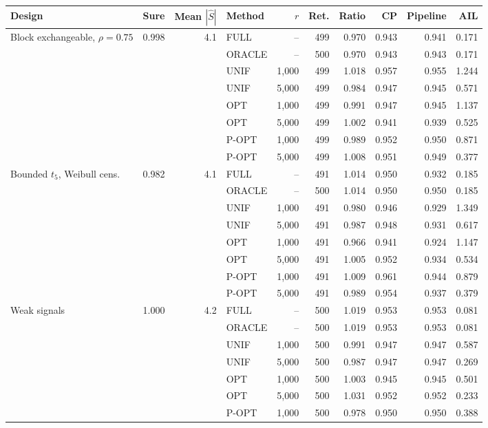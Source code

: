 \begin{tabular}{lrrlrrrrrr}
\toprule
Design & Sure & Mean \(|\widehat S|\) & Method & \(r\) & Ret. & Ratio & CP & Pipeline & AIL\\
\midrule
Block exchangeable, \(\rho=0.75\) & 0.998 & 4.1 & FULL & -- & 499 & 0.970 & 0.943 & 0.941 & 0.171\\
 &  &  & ORACLE & -- & 500 & 0.970 & 0.943 & 0.943 & 0.171\\
 &  &  & UNIF & 1,000 & 499 & 1.018 & 0.957 & 0.955 & 1.244\\
 &  &  & UNIF & 5,000 & 499 & 0.984 & 0.947 & 0.945 & 0.571\\
 &  &  & OPT & 1,000 & 499 & 0.991 & 0.947 & 0.945 & 1.137\\
 &  &  & OPT & 5,000 & 499 & 1.002 & 0.941 & 0.939 & 0.525\\
 &  &  & P-OPT & 1,000 & 499 & 0.989 & 0.952 & 0.950 & 0.871\\
 &  &  & P-OPT & 5,000 & 499 & 1.008 & 0.951 & 0.949 & 0.377\\
\addlinespace
Bounded \(t_5\), Weibull cens. & 0.982 & 4.1 & FULL & -- & 491 & 1.014 & 0.950 & 0.932 & 0.185\\
 &  &  & ORACLE & -- & 500 & 1.014 & 0.950 & 0.950 & 0.185\\
 &  &  & UNIF & 1,000 & 491 & 0.980 & 0.946 & 0.929 & 1.349\\
 &  &  & UNIF & 5,000 & 491 & 0.987 & 0.948 & 0.931 & 0.617\\
 &  &  & OPT & 1,000 & 491 & 0.966 & 0.941 & 0.924 & 1.147\\
 &  &  & OPT & 5,000 & 491 & 1.005 & 0.952 & 0.934 & 0.534\\
 &  &  & P-OPT & 1,000 & 491 & 1.009 & 0.961 & 0.944 & 0.879\\
 &  &  & P-OPT & 5,000 & 491 & 0.989 & 0.954 & 0.937 & 0.379\\
\addlinespace
Weak signals & 1.000 & 4.2 & FULL & -- & 500 & 1.019 & 0.953 & 0.953 & 0.081\\
 &  &  & ORACLE & -- & 500 & 1.019 & 0.953 & 0.953 & 0.081\\
 &  &  & UNIF & 1,000 & 500 & 0.991 & 0.947 & 0.947 & 0.587\\
 &  &  & UNIF & 5,000 & 500 & 0.987 & 0.947 & 0.947 & 0.269\\
 &  &  & OPT & 1,000 & 500 & 1.003 & 0.945 & 0.945 & 0.501\\
 &  &  & OPT & 5,000 & 500 & 1.031 & 0.952 & 0.952 & 0.233\\
 &  &  & P-OPT & 1,000 & 500 & 0.978 & 0.950 & 0.950 & 0.388\\

\end{tabular}
